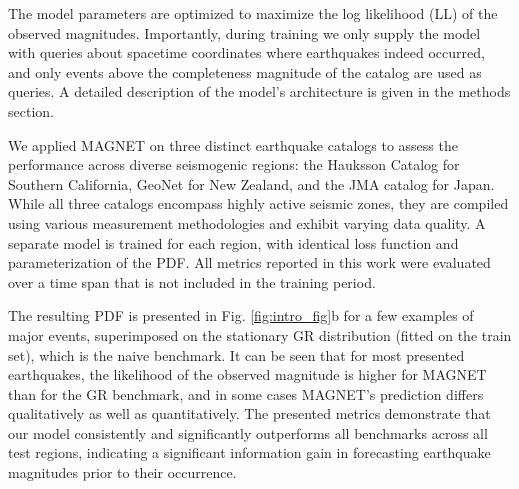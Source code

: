 \documentclass[pdflatex]{sn-jnl}
\begin{document}
The model parameters are optimized to maximize the log likelihood (LL) of the observed magnitudes. Importantly, during training we only supply the model with queries about spacetime coordinates where earthquakes indeed occurred, and only events above the completeness magnitude of the catalog are used as queries. A detailed description of the model's architecture is given in the methods section.


We applied MAGNET on three distinct earthquake catalogs to assess the performance across diverse seismogenic regions: the Hauksson Catalog \cite{hauksson_waveform_2012} for Southern California, GeoNet \cite{gns_geonet_1970} for New Zealand, and the JMA catalog \cite{noauthor_japan_nodate} for Japan. 
While all three catalogs encompass highly active seismic zones, they are compiled using various measurement methodologies and exhibit varying data quality. 
A separate model is trained for each region, with identical loss function and parameterization of the PDF. All metrics reported in this work were evaluated over a time span that is not included in the training period.

The resulting PDF is presented in Fig. \ref{fig:intro_fig}b for a few examples of major events, superimposed on the stationary GR distribution (fitted on the train set), which is the naive benchmark. 
It can be seen that for most presented earthquakes, the likelihood of the observed magnitude is higher for MAGNET than for the GR benchmark, and in some cases MAGNET's prediction differs qualitatively as well as quantitatively.
The presented metrics demonstrate that our model consistently and significantly outperforms all benchmarks across all test regions, indicating a significant information gain in forecasting earthquake magnitudes prior to their occurrence.
\end{document}
